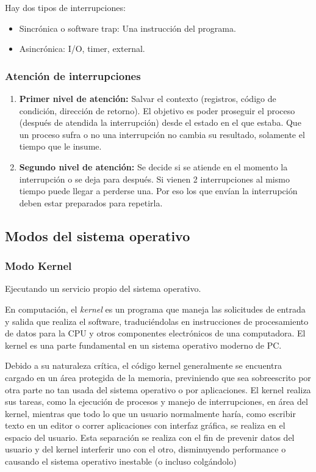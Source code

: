 \documentclass[a4paper, twoside]{article}
\begin{document}
Hay dos tipos de interrupciones:
\begin{itemize}
	\item Sincrónica o software trap: Una instrucción del programa.
	\item Asincrónica: I/O, timer, external.
\end{itemize}

\subsubsection{Atención de interrupciones}
\begin{enumerate}
	\item \textbf{Primer nivel de atención:} Salvar el contexto (registros, código de condición, dirección de retorno). El objetivo es poder proseguir el proceso (después de atendida la interrupción) desde el estado en el que estaba. Que un proceso sufra o no una interrupción no cambia su resultado, solamente el tiempo que le insume.
	
	\item \textbf{Segundo nivel de atención:} Se decide si se atiende en el momento la interrupción o se deja para después. Si vienen 2 interrupciones al mismo tiempo puede llegar a perderse una. Por eso los que envían la interrupción deben estar preparados para repetirla.
\end{enumerate}

\subsection{Modos del sistema operativo}
\subsubsection{Modo Kernel}
Ejecutando un servicio propio del sistema operativo.

En computación, el \emph{kernel} es un programa que maneja las solicitudes de entrada y salida que realiza el software, traduciéndolas en instrucciones de procesamiento de datos para la CPU y otros componentes electrónicos de una computadora. El kernel es una parte fundamental en un sistema operativo moderno de PC.

Debido a su naturaleza crítica, el código kernel generalmente se encuentra cargado en un área protegida de la memoria, previniendo que sea sobreescrito por otra parte no tan usada del sistema operativo o por aplicaciones. El kernel realiza sus tareas, como la ejecución de procesos y manejo de interrupciones, en área del kernel, mientras que todo lo que un usuario normalmente haría, como escribir texto en un editor o correr aplicaciones con interfaz gráfica, se realiza en el espacio del usuario. Esta separación se realiza con el fin de prevenir datos del usuario y del kernel interferir uno con el otro, disminuyendo performance o causando el sistema operativo inestable (o incluso colgándolo)
\end{document}
